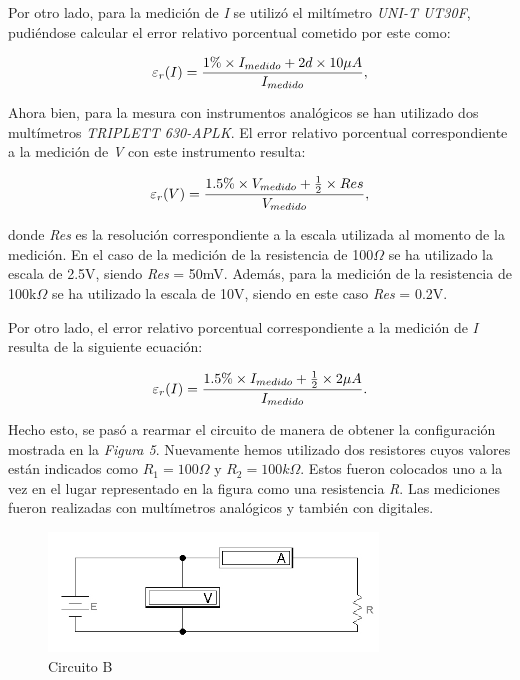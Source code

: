 \documentclass{article}
\begin{document}
	Por otro lado, para la medición de \textit{I} se utilizó el miltímetro \textit{UNI-T UT30F}, pudiéndose calcular el error relativo porcentual cometido por este como:
\bigskip

\begin{equation}
 	\varepsilon_r(I) = {1\%\times I_{medido} + 2d\times10\mu A \over I_{medido}},
\end{equation}
\bigskip


	Ahora bien, para la mesura con instrumentos analógicos se han utilizado dos multímetros \textit{TRIPLETT 630-APLK}. El error relativo porcentual correspondiente a la medición de \textit{V} con este instrumento resulta:
\bigskip

\begin{equation}
 	\varepsilon_r(V) = {1.5\%\times V_{medido} + {1 \over 2}\times Res \over V_{medido}},
\end{equation}
\bigskip	

\noindent donde \textit{Res} es la resolución correspondiente a la escala utilizada al momento de la medición. En el caso de la medición de la resistencia de 100$\Omega$ se ha utilizado la escala de 2.5V, siendo \textit{Res} = 50mV. Además, para la medición de la resistencia de 100k$\Omega$ se ha utilizado la escala de 10V, siendo en este caso \textit{Res} = 0.2V. 
	\par
	Por otro lado, el error relativo porcentual correspondiente a la medición de \textit{I} resulta de la siguiente ecuación:
\medskip

\begin{equation}
 	\varepsilon_r(I) = {1.5\%\times I_{medido} + {1 \over 2}\times 2\mu A \over I_{medido}}. 
\end{equation}
\bigskip



	Hecho esto, se pasó a rearmar el circuito de manera de obtener la configuración mostrada en la \textit{Figura 5}. Nuevamente hemos utilizado dos resistores cuyos valores están indicados como \textit{$R_1=100\Omega$} y \textit{$R_2=100k\Omega$}. Estos fueron colocados uno a la vez en el lugar representado en la figura como una resistencia \textit{R}. Las mediciones fueron realizadas con multímetros analógicos y también con digitales.
\bigskip

\begin{figure}[h]
	\centering
	\includegraphics[width=0.78\textwidth]{images/p2-item-b.jpg}
	\caption{Circuito B}
\end{figure}
\bigskip\bigskip
\end{document}

